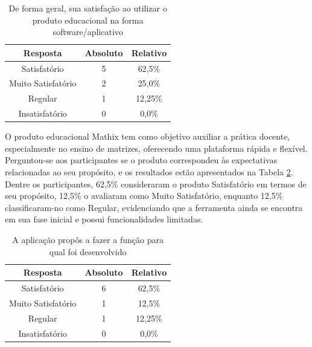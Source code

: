 \begin{table}[h!]
    \centering
    \caption{De forma geral, sua satisfação ao utilizar o produto educacional na forma software/aplicativo}
    \begin{tabular}{c|c|c}
        \textbf{Resposta} &	\textbf{Absoluto} & \textbf{Relativo} \\
        \hline
        Satisfatório & 5 & 62,5\% \\
        \hline
        Muito Satisfatório & 2 & 25,0\% \\
        \hline
        Regular & 1 & 12,25\% \\
        \hline
        Insatisfatório & 0 & 0,0\% \\
    \end{tabular}
    \label{tab:p4}
\end{table}



O produto educacional Mathix tem como objetivo auxiliar a prática docente, especialmente no ensino de matrizes, oferecendo uma plataforma rápida e flexível. Perguntou-se aos participantes se o produto correspondeu às expectativas relacionadas ao seu propósito, e os resultados estão apresentados na Tabela \ref{tab:p5}. Dentre os participantes, 62,5\% consideraram o produto Satisfatório em termos de seu propósito, 12,5\% o avaliaram como Muito Satisfatório, enquanto 12,5\% classificaram-no como Regular, evidenciando que a ferramenta ainda se encontra em sua fase inicial e possui funcionalidades limitadas.


\begin{table}[h!]
    \centering
    \caption{A aplicação propôs a fazer a função para qual foi desenvolvido}
    \begin{tabular}{c|c|c}
        \textbf{Resposta} &	\textbf{Absoluto} & \textbf{Relativo} \\
        \hline
        Satisfatório & 6 & 62,5\% \\
        \hline
        Muito Satisfatório & 1 & 12,5\% \\
        \hline
        Regular & 1 & 12,25\% \\
        \hline
        Insatisfatório & 0 & 0,0\% \\
    \end{tabular}
    \label{tab:p5}
\end{table}



